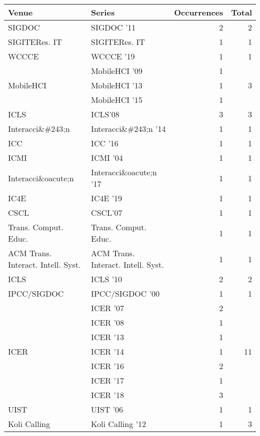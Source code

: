 \begin{table*}[t]
\begin{tabular}{llrr}
Venue & Series & Occurrences & Total\\\hline
\multirow{1}{*}{SIGDOC } & SIGDOC '11 & 2 & \multirow{1}{*}{2}\\
\multirow{1}{*}{SIGITERes. IT} & SIGITERes. IT & 1 & \multirow{1}{*}{1}\\
\multirow{1}{*}{WCCCE } & WCCCE '19 & 1 & \multirow{1}{*}{1}\\
\multirow{3}{*}{MobileHCI } & MobileHCI '09 & 1 & \multirow{3}{*}{3}\\
& MobileHCI '13 & 1 &\\
& MobileHCI '15 & 1 &\\
\multirow{1}{*}{ICLS} & ICLS'08 & 3 & \multirow{1}{*}{3}\\
\multirow{1}{*}{Interacci\&\#243;n } & Interacci\&\#243;n '14 & 1 & \multirow{1}{*}{1}\\
\multirow{1}{*}{ICC } & ICC '16 & 1 & \multirow{1}{*}{1}\\
\multirow{1}{*}{ICMI } & ICMI '04 & 1 & \multirow{1}{*}{1}\\
\multirow{1}{*}{Interacci\&oacute;n } & Interacci\&oacute;n '17 & 1 & \multirow{1}{*}{1}\\
\multirow{1}{*}{IC4E } & IC4E '19 & 1 & \multirow{1}{*}{1}\\
\multirow{1}{*}{CSCL} & CSCL'07 & 1 & \multirow{1}{*}{1}\\
\multirow{1}{*}{Trans. Comput. Educ.} & Trans. Comput. Educ. & 1 & \multirow{1}{*}{1}\\
\multirow{1}{*}{ACM Trans. Interact. Intell. Syst.} & ACM Trans. Interact. Intell. Syst. & 1 & \multirow{1}{*}{1}\\
\multirow{1}{*}{ICLS } & ICLS '10 & 2 & \multirow{1}{*}{2}\\
\multirow{1}{*}{IPCC/SIGDOC } & IPCC/SIGDOC '00 & 1 & \multirow{1}{*}{1}\\
\multirow{7}{*}{ICER } & ICER '07 & 2 & \multirow{7}{*}{11}\\
& ICER '08 & 1 &\\
& ICER '13 & 1 &\\
& ICER '14 & 1 &\\
& ICER '16 & 2 &\\
& ICER '17 & 1 &\\
& ICER '18 & 3 &\\
\multirow{1}{*}{UIST } & UIST '06 & 1 & \multirow{1}{*}{1}\\
\multirow{3}{*}{Koli Calling } & Koli Calling '12 & 1 & \multirow{3}{*}{3}\\

\end{tabular}
\end{table*}
